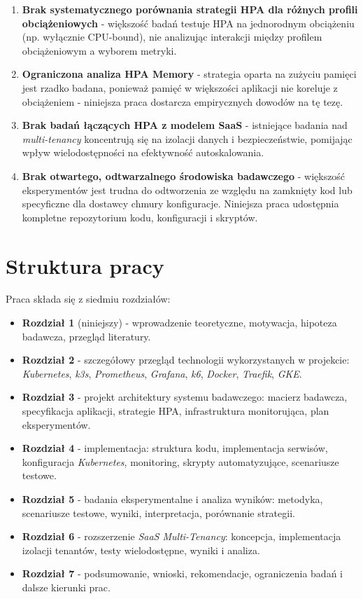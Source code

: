 \begin{enumerate}
  \item \textbf{Brak systematycznego porównania strategii HPA dla różnych profili obciążeniowych} - większość badań testuje HPA na jednorodnym obciążeniu (np. wyłącznie CPU-bound), nie analizując interakcji między profilem obciążeniowym a wyborem metryki.
  \item \textbf{Ograniczona analiza HPA Memory} - strategia oparta na zużyciu pamięci jest rzadko badana, ponieważ pamięć w większości aplikacji nie koreluje z obciążeniem - niniejsza praca dostarcza empirycznych dowodów na tę tezę.
  \item \textbf{Brak badań łączących HPA z modelem SaaS} - istniejące badania nad \textit{multi-tenancy} koncentrują się na izolacji danych i bezpieczeństwie, pomijając wpływ wielodostępności na efektywność autoskalowania.
  \item \textbf{Brak otwartego, odtwarzalnego środowiska badawczego} - większość eksperymentów jest trudna do odtworzenia ze względu na zamknięty kod lub specyficzne dla dostawcy chmury konfiguracje. Niniejsza praca udostępnia kompletne repozytorium kodu, konfiguracji i skryptów.
\end{enumerate}

\section{Struktura pracy}

Praca składa się z siedmiu rozdziałów:

\begin{itemize}
  \item \textbf{Rozdział 1} (niniejszy) - wprowadzenie teoretyczne, motywacja, hipoteza badawcza, przegląd literatury.
  \item \textbf{Rozdział 2} - szczegółowy przegląd technologii wykorzystanych w projekcie: \textit{Kubernetes}, \textit{k3s}, \textit{Prometheus}, \textit{Grafana}, \textit{k6}, \textit{Docker}, \textit{Traefik}, \textit{GKE}.
  \item \textbf{Rozdział 3} - projekt architektury systemu badawczego: macierz badawcza, specyfikacja aplikacji, strategie HPA, infrastruktura monitorująca, plan eksperymentów.
  \item \textbf{Rozdział 4} - implementacja: struktura kodu, implementacja serwisów, konfiguracja \textit{Kubernetes}, monitoring, skrypty automatyzujące, scenariusze testowe.
  \item \textbf{Rozdział 5} - badania eksperymentalne i analiza wyników: metodyka, scenariusze testowe, wyniki, interpretacja, porównanie strategii.
  \item \textbf{Rozdział 6} - rozszerzenie \textit{SaaS Multi-Tenancy}: koncepcja, implementacja izolacji tenantów, testy wielodostępne, wyniki i analiza.
  \item \textbf{Rozdział 7} - podsumowanie, wnioski, rekomendacje, ograniczenia badań i dalsze kierunki prac.
\end{itemize}
